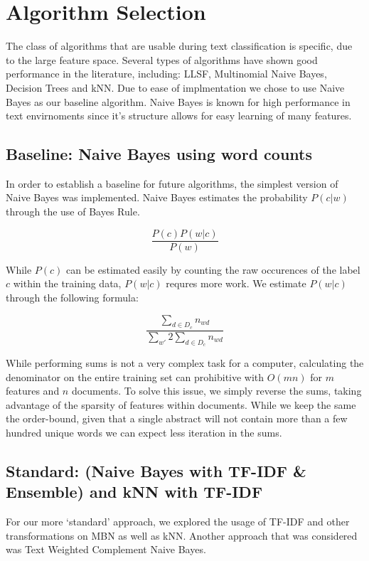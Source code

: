 \documentclass[10pt,twocolumn]{article}
\begin{document}
\section*{Algorithm Selection}

The class of algorithms that are usable during text classification is specific, due to the large feature space. Several types of algorithms have shown good performance in the literature, including: LLSF, Multinomial Naive Bayes, Decision Trees and kNN. Due to ease of implmentation we chose to use Naive Bayes as our baseline algorithm. Naive Bayes is known for high performance in text envirnoments since it's structure allows for easy learning of many features.

\subsection*{Baseline: Naive Bayes using word counts}

In order to establish a baseline for future algorithms, the simplest version of Naive Bayes was implemented. Naive Bayes estimates the probability $P(c|w)$ through the use of Bayes Rule.

\[ \frac {P(c)P(w|c)} {P(w)} \]

While $P(c)$ can be estimated easily by counting the raw occurences of the label $c$ within the training data, $P(w|c)$ requres more work. We estimate $P(w|c)$ through the following formula:

\[\frac {\sum_{d \in D_c} n_{wd}} {\sum_{w'} 2\sum_{d\in D_c} n_{wd}} \]

While performing sums is not a very complex task for a computer, calculating the denominator on the entire training set can prohibitive with $O(mn)$ for $m$ features and $n$ documents. To solve this issue, we simply reverse the sums, taking advantage of the sparsity of features within documents. While we keep the same the order-bound, given that a single abstract will not contain more than a few hundred unique words we can expect less iteration in the sums.

\subsection*{Standard: (Naive Bayes with TF-IDF \& Ensemble) and kNN with TF-IDF}

For our more `standard' approach, we explored the usage of TF-IDF and other transformations on MBN as well as kNN. Another approach that was considered was Text Weighted Complement Naive Bayes.
\end{document}
